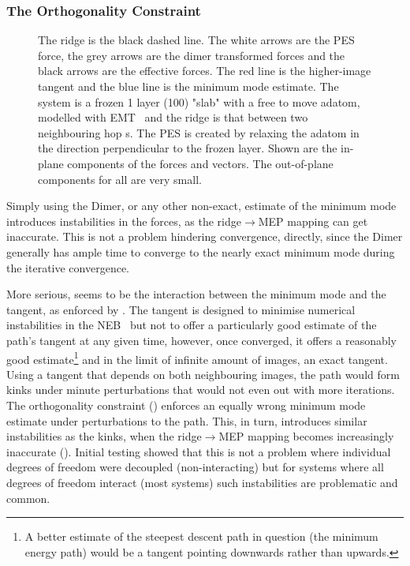 \subsubsection{The Orthogonality Constraint}
\begin{figure}[htb!]
\begin{center}
    \parbox{0.85\linewidth}{
\caption{
The ridge is the black dashed line.
The white arrows are the PES force, the grey arrows are the dimer transformed forces and the black arrows are the effective forces.
The red line is the higher-image tangent and the blue line is the minimum mode estimate.
The system is a frozen 1 layer (100) "slab" with a free to move  adatom, modelled with EMT~\cite{emt-1996} and the ridge is that between two neighbouring hop s.
The PES is created by relaxing the adatom in the direction perpendicular to the frozen layer.
Shown are the in-plane components of the forces and vectors.
The out-of-plane components for all are very small.
}
\label{fig:orthogonal}
}
\end{center}
\end{figure}

Simply using the Dimer, or any other non-exact, estimate of the minimum mode introduces instabilities in the forces, as the ridge$\rightarrow$MEP mapping can get inaccurate.
This is not a problem hindering convergence, directly, since the Dimer generally has ample time to converge to the nearly exact minimum mode during the iterative convergence.

More serious, seems to be the interaction between the minimum mode and the tangent, as enforced by .
The tangent is designed to minimise numerical instabilities in the NEB~\cite{neb-tangent-2000} but not to offer a particularly good estimate of the path's tangent at any given time, however, once converged, it offers a reasonably good estimate\footnote{A better estimate of the steepest descent path in question (the minimum energy path) would be a tangent pointing downwards rather than upwards.} and in the limit of infinite amount of images, an exact tangent.
Using a tangent that depends on both neighbouring images, the path would form kinks under minute perturbations that would not even out with more iterations.
The orthogonality constraint () enforces an equally wrong minimum mode estimate under perturbations to the path.
This, in turn, introduces similar instabilities as the kinks, when the ridge$\rightarrow$MEP mapping becomes increasingly inaccurate ().
Initial testing showed that this is not a problem where individual degrees of freedom were decoupled (non-interacting) but for systems where all degrees of freedom interact (most systems) such instabilities are problematic and common.

